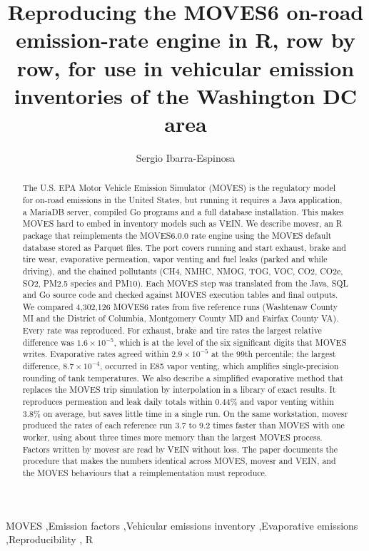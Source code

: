 \documentclass[preprint,
3p]{elsarticle} %
\begin{document}
\begin{frontmatter}

  \title{Reproducing the MOVES6 on-road emission-rate engine in R, row
by row, for use in vehicular emission inventories of the Washington DC
area}
    \author[a]{Sergio Ibarra-Espinosa%
  }
  
  \begin{abstract}
  The U.S. EPA Motor Vehicle Emission Simulator (MOVES) is the
  regulatory model for on-road emissions in the United States, but
  running it requires a Java application, a MariaDB server, compiled Go
  programs and a full database installation. This makes MOVES hard to
  embed in inventory models such as VEIN. We describe movesr, an R
  package that reimplements the MOVES6.0.0 rate engine using the MOVES
  default database stored as Parquet files. The port covers running and
  start exhaust, brake and tire wear, evaporative permeation, vapor
  venting and fuel leaks (parked and while driving), and the chained
  pollutants (CH4, NMHC, NMOG, TOG, VOC, CO2, CO2e, SO2, PM2.5 species
  and PM10). Each MOVES step was translated from the Java, SQL and Go
  source code and checked against MOVES execution tables and final
  outputs. We compared 4,302,126 MOVES6 rates from five reference runs
  (Washtenaw County MI and the District of Columbia, Montgomery County
  MD and Fairfax County VA). Every rate was reproduced. For exhaust,
  brake and tire rates the largest relative difference was
  \(1.6 \times 10^{-5}\), which is at the level of the six significant
  digits that MOVES writes. Evaporative rates agreed within
  \(2.9 \times 10^{-5}\) at the 99th percentile; the largest difference,
  \(8.7 \times 10^{-4}\), occurred in E85 vapor venting, which amplifies
  single-precision rounding of tank temperatures. We also describe a
  simplified evaporative method that replaces the MOVES trip simulation
  by interpolation in a library of exact results. It reproduces
  permeation and leak daily totals within 0.44\% and vapor venting
  within 3.8\% on average, but saves little time in a single run. On the
  same workstation, movesr produced the rates of each reference run 3.7
  to 9.2 times faster than MOVES with one worker, using about three
  times more memory than the largest MOVES process. Factors written by
  movesr are read by VEIN without loss. The paper documents the
  procedure that makes the numbers identical across MOVES, movesr and
  VEIN, and the MOVES behaviours that a reimplementation must reproduce.
  \end{abstract}
    \begin{keyword}
    MOVES \sep Emission factors \sep Vehicular emissions
inventory \sep Evaporative emissions \sep Reproducibility \sep 
    R
  \end{keyword}
  
 \end{frontmatter}
\end{document}
